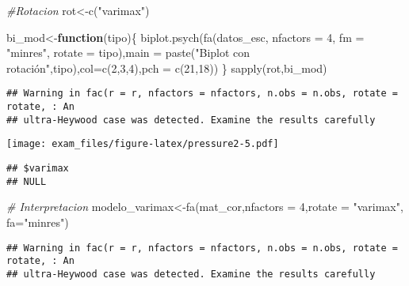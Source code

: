 \documentclass[
]{article}
\newenvironment{Shaded}{\begin{snugshade}}{\end{snugshade}}
\newcommand{\AttributeTok}[1]{\textcolor[rgb]{0.77,0.63,0.00}{#1}}
\newcommand{\CommentTok}[1]{\textcolor[rgb]{0.56,0.35,0.01}{\textit{#1}}}
\newcommand{\ControlFlowTok}[1]{\textcolor[rgb]{0.13,0.29,0.53}{\textbf{#1}}}
\newcommand{\DecValTok}[1]{\textcolor[rgb]{0.00,0.00,0.81}{#1}}
\newcommand{\FunctionTok}[1]{\textcolor[rgb]{0.00,0.00,0.00}{#1}}
\newcommand{\NormalTok}[1]{#1}
\newcommand{\OtherTok}[1]{\textcolor[rgb]{0.56,0.35,0.01}{#1}}
\newcommand{\StringTok}[1]{\textcolor[rgb]{0.31,0.60,0.02}{#1}}
\begin{document}
\begin{Shaded}
\begin{Highlighting}[]
  \CommentTok{\#Rotacion}
\NormalTok{  rot}\OtherTok{\textless{}{-}}\FunctionTok{c}\NormalTok{(}\StringTok{"varimax"}\NormalTok{)}
  
\NormalTok{  bi\_mod}\OtherTok{\textless{}{-}}\ControlFlowTok{function}\NormalTok{(tipo)\{}
    \FunctionTok{biplot.psych}\NormalTok{(}\FunctionTok{fa}\NormalTok{(datos\_esc, }\AttributeTok{nfactors =} \DecValTok{4}\NormalTok{, }\AttributeTok{fm =} \StringTok{"minres"}\NormalTok{, }\AttributeTok{rotate =}\NormalTok{ tipo),}\AttributeTok{main =} \FunctionTok{paste}\NormalTok{(}\StringTok{"Biplot con rotación"}\NormalTok{,tipo),}\AttributeTok{col=}\FunctionTok{c}\NormalTok{(}\DecValTok{2}\NormalTok{,}\DecValTok{3}\NormalTok{,}\DecValTok{4}\NormalTok{),}\AttributeTok{pch =} \FunctionTok{c}\NormalTok{(}\DecValTok{21}\NormalTok{,}\DecValTok{18}\NormalTok{))  }
\NormalTok{  \}}
  \FunctionTok{sapply}\NormalTok{(rot,bi\_mod)}
\end{Highlighting}
\end{Shaded}

\begin{verbatim}
## Warning in fac(r = r, nfactors = nfactors, n.obs = n.obs, rotate = rotate, : An
## ultra-Heywood case was detected. Examine the results carefully
\end{verbatim}

\texttt{[image: exam\_files/figure-latex/pressure2-5.pdf]}

\begin{verbatim}
## $varimax
## NULL
\end{verbatim}

\begin{Shaded}
\begin{Highlighting}[]
  \CommentTok{\# Interpretacion}
\NormalTok{  modelo\_varimax}\OtherTok{\textless{}{-}}\FunctionTok{fa}\NormalTok{(mat\_cor,}\AttributeTok{nfactors =} \DecValTok{4}\NormalTok{,}\AttributeTok{rotate =} \StringTok{"varimax"}\NormalTok{,}
                     \AttributeTok{fa=}\StringTok{"minres"}\NormalTok{)}
\end{Highlighting}
\end{Shaded}

\begin{verbatim}
## Warning in fac(r = r, nfactors = nfactors, n.obs = n.obs, rotate = rotate, : An
## ultra-Heywood case was detected. Examine the results carefully
\end{verbatim}
\end{document}
